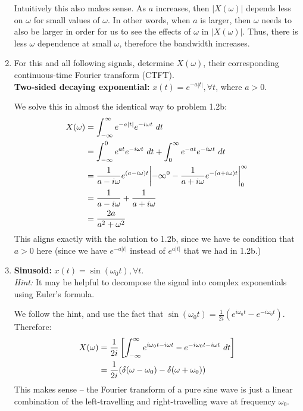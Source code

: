 \documentclass[10pt]{article}
\begin{document}
\begin{enumerate}[label=\alph*)]
\begin{solution}
				Intuitively this also makes sense. As \( a \) increases, then \( |X(\omega)| \) depends less 
				on \( \omega \) for small values of \( \omega \). In other words, when \( a \) is larger, then 
				\( \omega \) needs to also be larger in order for us to see the effects of \( \omega \) in 
				\( |X(\omega)| \). Thus, there is less \( \omega \) dependence at small \( \omega \), therefore 
				the bandwidth increases. 
			\end{solution}
		\item For this and all following signals, determine \( X(\omega) \), their corresponding continuous-time 
			Fourier transform (CTFT). \\
			\textbf{Two-sided decaying exponential:} \( x(t) = e^{-a|t|}, \forall t \), where \( a >0 \). 

			\begin{solution}
				We solve this in almost the identical way to problem 1.2b:
				\begin{align*}
					X(\omega) &= \int_{-\infty}^{\infty} e^{-a|t|}e^{-i \omega t}\ d t \\
					&= \int_{-\infty}^{0} e^{at}e^{-i \omega t}\ d t + \int_{0}^{\infty} e^{-at} e^{-i \omega t}
					\ d t\\
					&= \frac{1}{a - i \omega}e^{(a - i \omega) t} \biggr|{-\infty}^0 
					- \frac{1}{a + i \omega}e^{-(a + i \omega) t}\biggr|_0^\infty\\
					&= \frac{1}{a - i \omega} + \frac{1}{a + i \omega} \\
					&= \frac{2a}{a^2 + \omega^2} 
				\end{align*}
				This aligns exactly with the solution to 1.2b, since we have te condition that \( a > 0 \) here 
				(since we have \( e^{-a|t|} \) instead of \( e^{a|t|} \) that we had in 1.2b.)
			\end{solution}
		\item \textbf{Sinusoid:} \( x(t) = \sin(\omega_0 t), \forall t \). \\
			\textit{Hint:} It may be helpful to decompose the signal into complex exponentials using Euler's 
			formula. 

			\begin{solution}
				We follow the hint, and use the fact that \( \sin(\omega_0t) = \frac{1}{2i}(e^{i \omega_0 t}
				- e^{-i \omega_0t})\). Therefore:
				\begin{align*}
					X(\omega) &= \frac{1}{2i}\left[ \int_{-\infty}^{\infty} e^{i \omega_0 t - i \omega t}
					- e^{-i \omega_0 t - i \omega t} \ d  t\right]  \\
					&= \frac{1}{2i}(\delta(\omega - \omega_0) - \delta(\omega + \omega_0)) 
				\end{align*}
				This makes sense -- the Fourier transform of a pure sine wave is just a linear combination of 
				the left-travelling and right-travelling wave at frequency \( \omega_0 \).
			\end{solution}
	\end{enumerate}
	\pagebreak
\end{document}
